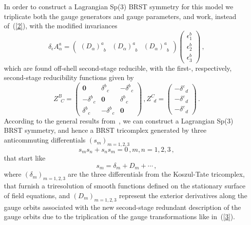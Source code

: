 \documentclass[a4paper,10pt]{article}
\begin{document}
In order to construct a Lagrangian Sp(3) BRST symmetry for this model we
triplicate both the gauge generators and gauge parameters, and work, instead
of~(\ref{2}), with the modified invariances 
\begin{equation}
\label{3}
\delta _{\epsilon }A_{\alpha }^{a}=\left( 
\begin{array}{lll}
\left( D_{\alpha }\right) _{\;\;b}^{a} & \left( D_{\alpha }\right)
_{\;\;b}^{a} & \left( D_{\alpha }\right) _{\;\;b}^{a}
\end{array}
\right) \left( 
\begin{array}{l}
\epsilon _{1}^{b} \\ 
\epsilon _{2}^{b} \\ 
\epsilon _{3}^{b}
\end{array}
\right) \,,
\end{equation}
which are found off-shell second-stage reducible, with the first-,
respectively, second-stage reducibility functions given by 
\begin{equation}
\label{4}
Z_{\;\;C}^{B}=\left( 
\begin{array}{ccc}
\mathbf{0} & \delta _{\;\;c}^{b} & -\delta _{\;\;c}^{b} \\ 
-\delta _{\;\;c}^{b} & \mathbf{0} & \delta _{\;\;c}^{b} \\ 
\delta _{\;\;c}^{b} & -\delta _{\;\;c}^{b} & \mathbf{0}
\end{array}
\right) \,, Z_{\;\;d}^{C}=\left( 
\begin{array}{c}
-\delta _{\;\;d}^{c} \\ 
-\delta _{\;\;d}^{c} \\ 
-\delta _{\;\;d}^{c}
\end{array}
\right) \,.
\end{equation}
According to the general results from~\cite{sp3gen}, we can construct a
Lagrangian Sp(3) BRST symmetry, and hence a BRST tricomplex generated by
three anticommuting differentials $\left( s_{m}\right) _{m=1,2,3}$ 
\begin{equation}
\label{5}
s_{m}s_{n}+s_{n}s_{m}=0\,, m,n=1,2,3\,,
\end{equation}
that start like 
\begin{equation}
\label{6}
s_{m}=\delta _{m}+D_{m}+\cdots \,,
\end{equation}
where $\left( \delta _{m}\right) _{m=1,2,3}$ are the three differentials
from the Koszul-Tate tricomplex, that furnish a triresolution of smooth
functions defined on the stationary surface of field equations, and $\left(
D_{m}\right) _{m=1,2,3}$ represent the exterior derivatives along the gauge
orbits associated with the new second-stage redundant description of the
gauge orbits due to the triplication of the gauge transformations like 
in~(\ref{3}).
\end{document}
